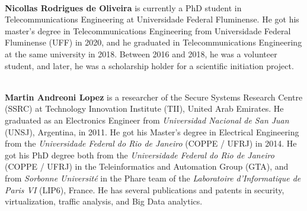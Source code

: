 \documentclass[a4paper,11pt]{article}
\begin{document}
~\\
\textbf{Nicollas Rodrigues de Oliveira} is currently a PhD student in Telecommunications Engineering at Universidade Federal Fluminense. He got his master's degree in Telecommunications Engineering from Universidade Federal Fluminense (UFF) in 2020, and he graduated in Telecommunications Engineering at the same university in 2018. Between 2016 and 2018, he was a volunteer student, and later, he was a scholarship holder for a scientific initiation project. 

\vspace{1cm}

~\\
\textbf{Martin Andreoni Lopez} is a researcher of the Secure Systems Research Centre (SSRC) at Technology Innovation Institute (TII), United Arab Emirates. He graduated as an Electronics Engineer from \textit{Universidad Nacional de San Juan} (UNSJ), Argentina, in 2011. He got his Master's degree in Electrical Engineering from the \textit{Universidade Federal do Rio de Janeiro} (COPPE / UFRJ) in 2014. He got his PhD degree both from the \textit{Universidade Federal do Rio de Janeiro} (COPPE / UFRJ) in the Teleinformatics and Automation Group (GTA), and from \textit {Sorbonne Université} in the Phare team of the \textit {Laboratoire d'Informatique de Paris VI} (LIP6), France. He has several publications and patents in security, virtualization, traffic analysis, and Big Data analytics. 

\vspace{1cm}
\end{document}
